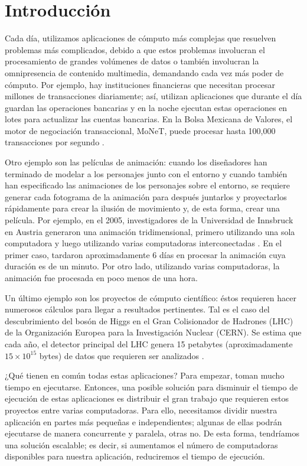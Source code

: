\chapter{Introducción}

Cada día, utilizamos aplicaciones de cómputo más complejas que resuelven problemas más complicados, debido a que estos problemas involucran el procesamiento de grandes volúmenes de datos o también involucran la omnipresencia de contenido multimedia, demandando cada vez más poder de cómputo. Por ejemplo, hay instituciones financieras que necesitan procesar millones de transacciones diariamente; así, utilizan aplicaciones que durante el día guardan las operaciones bancarias y en la noche ejecutan estas operaciones en lotes para actualizar las cuentas bancarias. En la Bolsa Mexicana de Valores, el motor de negociación transaccional, MoNeT, puede procesar hasta 100,000 transacciones por segundo \cite{bmv2012informe}. 

Otro ejemplo son las películas de animación: cuando los diseñadores han terminado de modelar a los personajes junto con el entorno y cuando también han especificado las animaciones de los personajes sobre el entorno, se requiere generar cada fotograma de la animación para después juntarlos y proyectarlos rápidamente para crear la ilusión de movimiento y, de esta forma, crear una película. Por ejemplo, en el 2005, investigadores de la Universidad de Innsbruck en Austria generaron una animación tridimensional, primero utilizando una sola computadora y luego utilizando varias computadoras interconectadas \cite{nerieri2005using}. En el primer caso, tardaron aproximadamente 6 días en procesar la animación cuya duración es de un minuto. Por otro lado, utilizando varias computadoras, la animación fue procesada en poco menos de una hora.

Un último ejemplo son los proyectos de cómputo científico: éstos requieren hacer numerosos cálculos para llegar a resultados pertinentes. Tal es el caso del descubrimiento del bosón de Higgs en el Gran Colisionador de Hadrones (LHC) de la Organización Europea para la Investigación Nuclear (CERN). Se estima que cada año, el detector principal del LHC genera 15 petabytes (aproximadamente $15 \times 10^{15}$ bytes) de datos que requieren ser analizados \cite{shiers2007worldwide}. 

¿Qué tienen en común todas estas aplicaciones? Para empezar, toman mucho tiempo en ejecutarse. Entonces, una posible solución para disminuir el tiempo de ejecución de estas aplicaciones es distribuir el gran trabajo que requieren estos proyectos entre varias computadoras. Para ello, necesitamos dividir nuestra aplicación en partes más pequeñas e independientes; algunas de ellas podrán ejecutarse de manera concurrente y paralela, otras no. De esta forma, tendríamos una solución escalable; es decir, si aumentamos el número de computadoras disponibles para nuestra aplicación, reduciremos el tiempo de ejecución.

